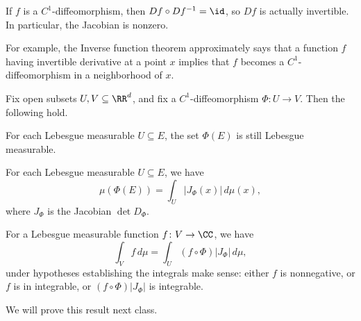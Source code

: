 \documentclass[../notes.tex]{subfiles}
\begin{document}
\begin{remark}
	If $f$ is a $C^1$-diffeomorphism, then $Df\circ Df^{-1}=\id$, so $Df$ is actually invertible. In particular, the Jacobian is nonzero.
\end{remark}
\begin{remark}
	For example, the Inverse function theorem approximately says that a function $f$ having invertible derivative at a point $x$ implies that $f$ becomes a $C^1$-diffeomorphism in a neighborhood of $x$.
\end{remark}
\begin{theorem} \label{thm:change-vars}
	Fix open subsets $U,V\subseteq\RR^d$, and fix a $C^1$-diffeomorphism $\Phi\colon U\to V$. Then the following hold.
	\begin{listalph}
		\item For each Lebesgue measurable $U\subseteq E$, the set $\Phi(E)$ is still Lebesgue measurable.
		\item For each Lebesgue measurable $U\subseteq E$, we have
		\[\mu(\Phi(E))=\int_U\left|J_\Phi(x)\right|\,d\mu(x),\]
		where $J_\Phi$ is the Jacobian $\det D_\Phi$.
		\item For a Lebesgue measurable function $f\colon V\to\CC$, we have
		\[\int_Vf\,d\mu=\int_U(f\circ\Phi)\left|J_\Phi\right|\,d\mu,\]
		under hypotheses establishing the integrals make sense: either $f$ is nonnegative, or $f$ is in integrable, or $(f\circ\Phi)\left|J_\Phi\right|$ is integrable.
	\end{listalph}
\end{theorem}
We will prove this result next class.
\end{document}
